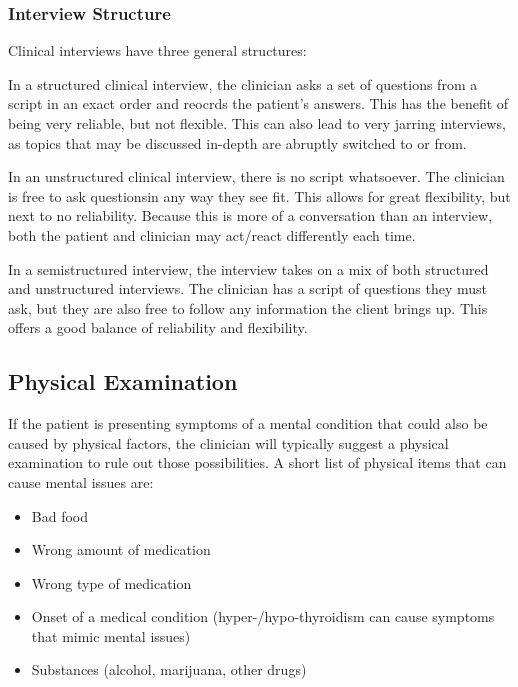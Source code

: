 \subsubsection{Interview Structure}\label{subsubsec:Interview_Structure}
Clinical interviews have three general structures:
\begin{description}[noitemsep]
\item[Structured] In a structured clinical interview, the clinician asks a set of questions from a script in an exact order and reocrds the patient's answers.
  This has the benefit of being very reliable, but not flexible.
  This can also lead to very jarring interviews, as topics that may be discussed in-depth are abruptly switched to or from.
\item[Unstructured] In an unstructured clinical interview, there is no script whatsoever.
  The clinician is free to ask questionsin any way they see fit.
  This allows for great flexibility, but next to no reliability.
  Because this is more of a conversation than an interview, both the patient and clinician may act/react differently each time.
\item[Semistructured] In a semistructured interview, the interview takes on a mix of both structured and unstructured interviews.
  The clinician has a script of questions they must ask, but they are also free to follow any information the client brings up.
  This offers a good balance of reliability and flexibility.
\end{description}

\subsection{Physical Examination}\label{subsec:Physical_Examination}
If the patient is presenting symptoms of a mental condition that could also be caused by physical factors, the clinician will typically suggest a physical examination to rule out those possibilities.
A short list of physical items that can cause mental issues are:
\begin{itemize}[noitemsep]
\item Bad food
\item Wrong amount of medication
\item Wrong type of medication
\item Onset of a medical condition (hyper-/hypo-thyroidism can cause symptoms that mimic mental issues)
\item Substances (alcohol, marijuana, other drugs)
\end{itemize}


